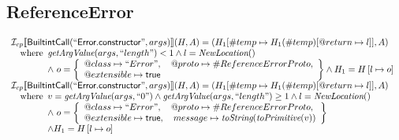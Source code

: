 \subsection{ReferenceError}
\[
\begin{array}{l}
\mathcal{I} _{cp}\llbracket \mbox{\textsf{BuiltintCall}}(``\mbox{\textsf{Error.constructor}}",args)\rrbracket(H,A)
  = (H_1[\#temp \mapsto H_1(\#temp)[@return \mapsto l]], A)\\
\quad{\rm where}\begin{array}[t]{l}
  \emph{getArgValue}(args, ``length") < 1 
  \land l=\emph{NewLocation}()\\
  \land\ o = \left\{\begin{array}{l}
    @class\mapsto ``Error", \quad
    @proto\mapsto \#ReferenceErrorProto,\\
    @extensible\mapsto \mbox{\textsf{true}}
    \end{array}\right\}
  \land H_1=H\left[l\mapsto o\right]\\
  \end{array}\\
  
\mathcal{I} _{cp}\llbracket \mbox{\textsf{BuiltintCall}}(``\mbox{\textsf{Error.constructor}}",args)\rrbracket(H,A)
  = (H_1[\#temp \mapsto H_1(\#temp)[@return \mapsto l]], A)\\
\quad{\rm where}\begin{array}[t]{l}
  v = \emph{getArgValue}(args, ``0") \land \emph{getArgValue}(args, ``length") \geq 1
  \land l=\emph{NewLocation}()\\
  \land\ o = \left\{\begin{array}{l}
    @class\mapsto ``Error", \quad
    @proto\mapsto \#ReferenceErrorProto,\\
    @extensible\mapsto \mbox{\textsf{true}},  \quad
    message \mapsto \emph{toString}(\emph{toPrimitive}(v)) 
    \end{array}\right\}\\
  \land H_1=H\left[l\mapsto o\right]
  \end{array}\\

\end{array}
\]


